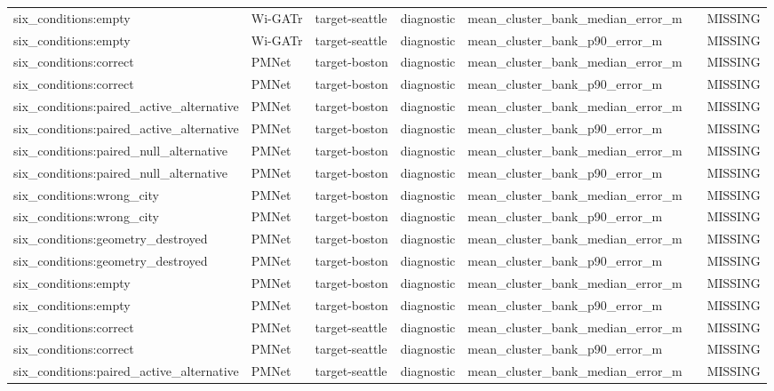 \begin{longtable}{lllllll}
six\_conditions:empty & Wi-GATr & target-seattle & diagnostic & mean\_cluster\_bank\_median\_error\_m &  & MISSING \\
six\_conditions:empty & Wi-GATr & target-seattle & diagnostic & mean\_cluster\_bank\_p90\_error\_m &  & MISSING \\
six\_conditions:correct & PMNet & target-boston & diagnostic & mean\_cluster\_bank\_median\_error\_m &  & MISSING \\
six\_conditions:correct & PMNet & target-boston & diagnostic & mean\_cluster\_bank\_p90\_error\_m &  & MISSING \\
six\_conditions:paired\_active\_alternative & PMNet & target-boston & diagnostic & mean\_cluster\_bank\_median\_error\_m &  & MISSING \\
six\_conditions:paired\_active\_alternative & PMNet & target-boston & diagnostic & mean\_cluster\_bank\_p90\_error\_m &  & MISSING \\
six\_conditions:paired\_null\_alternative & PMNet & target-boston & diagnostic & mean\_cluster\_bank\_median\_error\_m &  & MISSING \\
six\_conditions:paired\_null\_alternative & PMNet & target-boston & diagnostic & mean\_cluster\_bank\_p90\_error\_m &  & MISSING \\
six\_conditions:wrong\_city & PMNet & target-boston & diagnostic & mean\_cluster\_bank\_median\_error\_m &  & MISSING \\
six\_conditions:wrong\_city & PMNet & target-boston & diagnostic & mean\_cluster\_bank\_p90\_error\_m &  & MISSING \\
six\_conditions:geometry\_destroyed & PMNet & target-boston & diagnostic & mean\_cluster\_bank\_median\_error\_m &  & MISSING \\
six\_conditions:geometry\_destroyed & PMNet & target-boston & diagnostic & mean\_cluster\_bank\_p90\_error\_m &  & MISSING \\
six\_conditions:empty & PMNet & target-boston & diagnostic & mean\_cluster\_bank\_median\_error\_m &  & MISSING \\
six\_conditions:empty & PMNet & target-boston & diagnostic & mean\_cluster\_bank\_p90\_error\_m &  & MISSING \\
six\_conditions:correct & PMNet & target-seattle & diagnostic & mean\_cluster\_bank\_median\_error\_m &  & MISSING \\
six\_conditions:correct & PMNet & target-seattle & diagnostic & mean\_cluster\_bank\_p90\_error\_m &  & MISSING \\
six\_conditions:paired\_active\_alternative & PMNet & target-seattle & diagnostic & mean\_cluster\_bank\_median\_error\_m &  & MISSING \\

\end{longtable}
